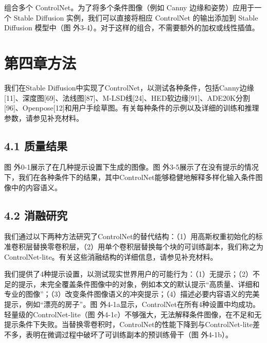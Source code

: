 \documentclass[a4paper,AutoFakeBold,oneside,12pt]{book}
\begin{document}
\begin{nopagenumber}
组合多个 ControlNet。为了将多个条件图像（例如 Canny 边缘和姿势）应用于一个 Stable Diffusion 实例，我们可以直接将相应 ControlNet 的输出添加到 Stable Diffusion 模型中（图 外3-4）。对于这样的组合，不需要额外的加权或线性插值。




\newpage
\chapter*{第四章\quad{}方法}
\newtranschapter
我们在Stable Diffusion中实现了ControlNet，以测试各种条件，包括Canny边缘[11]、深度图[69]、法线图[87]、M-LSD线[24]、HED软边缘[91]、ADE20K分割[96]、Openpose[12]和用户手绘草图。有关每种条件的示例以及详细的训练和推理参数，请参见补充材料。
\section*{4.1\quad{} 质量结果}
图 外0-1展示了在几种提示设置下生成的图像。图 外3-5展示了在没有提示的情况下，我们在各种条件下的结果，其中ControlNet能够稳健地解释多样化输入条件图像中的内容语义。
\section*{4.2\quad{} 消融研究}
我们通过以下两种方法研究了ControlNet的替代结构：（1）用高斯权重初始化的标准卷积层替换零卷积层，（2）用单个卷积层替换每个块的可训练副本，我们称之为ControlNet-lite。有关这些消融结构的详细信息，请参见补充材料。

我们提供了4种提示设置，以测试现实世界用户的可能行为：（1）无提示；（2）不足的提示，未完全覆盖条件图像中的对象，例如本文的默认提示“高质量、详细和专业的图像”；（3）改变条件图像语义的冲突提示；（4）描述必要内容语义的完美提示，例如“漂亮的房子”。图 外4-1a显示，ControlNet在所有4种设置中均成功。轻量级的ControlNet-lite（图 外4-1c）不够强大，无法解释条件图像，在不足和无提示条件下失败。当替换零卷积时，ControlNet的性能下降到与ControlNet-lite差不多，表明在微调过程中破坏了可训练副本的预训练骨干（图 外4-1b）。


\end{nopagenumber}
\end{document}
